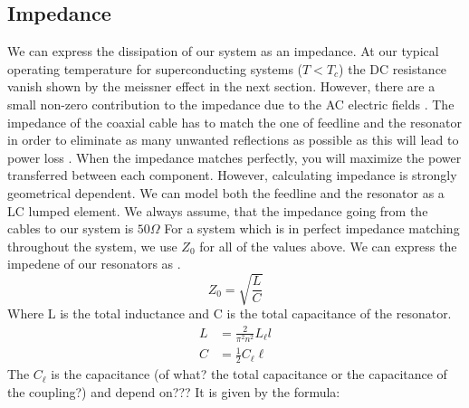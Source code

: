     
    
    \subsection{Impedance}
        We can express the dissipation of our system as an impedance. At our typical operating temperature for superconducting systems ($T<T_c$) the DC resistance vanish shown by the meissner effect in the next section. However, there are a small non-zero contribution to the impedance due to the AC electric fields \cite{Zmuidzinas2012}. The impedance of the coaxial cable has to match the one of feedline and the resonator in order to eliminate as many unwanted reflections as possible as this will lead to power loss \cite{Pozar2012}. When the impedance matches perfectly, you will maximize the power transferred between each component. However, calculating impedance is strongly geometrical dependent. We can model both the feedline and the resonator as a LC lumped element.
        We always assume, that the impedance going from the cables to our system is $50 \Omega$ For a system which is in perfect impedance matching throughout the system, we use $Z_{0}$  for all of the values above. We can express the impedene of our resonators as \cite{Pozar2012}.
        \begin{equation}
            Z_{0} = \sqrt{\frac{L}{C}}
        \end{equation}
        Where L is the total inductance and C is the total capacitance of the resonator. 
        \begin{equation} 
            \begin{aligned}
                L &= \frac{2}{\pi^{2} n^{2}} L_{\ell} l \\
                C &=\frac{1}{2} C_{\ell} \ell
            \end{aligned}
        \end{equation}
        The $C_{\ell}$ is the capacitance (of what? the total capacitance or the capacitance of the coupling?) and depend on???
        It is given by the formula: 
